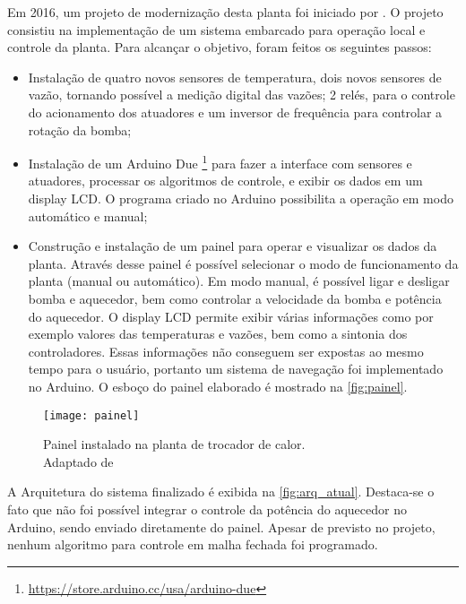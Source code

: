 			
		Em 2016, um projeto de modernização desta planta foi iniciado por \cite{luiz2016}.  O projeto consistiu na implementação de um sistema embarcado para operação local e controle da planta. Para alcançar o objetivo, foram feitos os seguintes passos:
		\begin{itemize}
			\item 
			Instalação de quatro novos sensores de temperatura, dois novos sensores de vazão, tornando possível a medição digital das vazões; 2 relés, para o controle do acionamento dos atuadores e um inversor de frequência para controlar a rotação da bomba;
			\item 
			Instalação de um Arduino Due \footnote{\url{https://store.arduino.cc/usa/arduino-due}} para fazer a interface com sensores e atuadores, processar os algoritmos de controle, e exibir os dados em um display LCD. O programa criado no Arduino possibilita a operação em modo automático e manual;
			\item 
			Construção e instalação de um painel para operar e visualizar os dados da planta. Através desse painel é possível selecionar o modo de funcionamento da planta (manual ou automático). Em modo manual, é possível ligar e desligar bomba e aquecedor, bem como controlar a velocidade da bomba e potência do aquecedor. O display LCD permite exibir várias informações como por exemplo valores das temperaturas e vazões, bem como a sintonia dos controladores. Essas informações não conseguem ser expostas ao mesmo tempo para o usuário, portanto um sistema de navegação foi implementado no Arduino. O esboço do painel elaborado é mostrado na \autoref{fig:painel}.
		\end{itemize}
			
			\begin{figure}[!htb]	
				\captionsetup{justification=centering}
				\begin{center}
					\texttt{[image: painel]}  %
					\caption[Painel instalado na planta de trocador de calor]{\label{fig:painel}Painel instalado na planta de trocador de calor. \\Adaptado de \cite{luiz2016}}
				\end{center}		
			\end{figure}
		
			A Arquitetura do sistema finalizado é exibida na \autoref{fig:arq_atual}. Destaca-se o fato que não foi possível integrar o controle da potência do aquecedor no Arduino, sendo enviado diretamente do painel. Apesar de previsto no projeto, nenhum algoritmo para controle em malha fechada foi programado.
		
